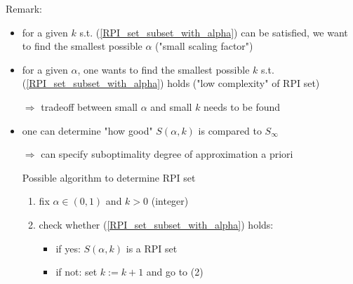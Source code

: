 Remark:
\begin{itemize}
\item for a given $k$ s.t. (\ref{RPI_set_subset_with_alpha}) can be satisfied, we want to find the smallest possible $\alpha$ ("small scaling factor")
\item for a given $\alpha$, one wants to find the smallest possible $k$ s.t. (\ref{RPI_set_subset_with_alpha}) holds ("low complexity" of RPI set)

$\Rightarrow$ tradeoff between small $\alpha$ and small $k$ needs to be found 
\item one can determine "how good" $S(\alpha,k)$ is compared to $S_{\infty}$

$\Rightarrow$ can specify suboptimality degree of approximation a priori

Possible algorithm to determine RPI set
\begin{enumerate}
\item fix $\alpha \in (0,1)$ and $k > 0$ (integer)
\item check whether (\ref{RPI_set_subset_with_alpha}) holds:
\begin{itemize}
\item if yes: $S(\alpha,k)$ is a RPI set
\item if not: set $k := k+1$ and go to (2)
\end{itemize}
\end{enumerate}
\end{itemize}   
